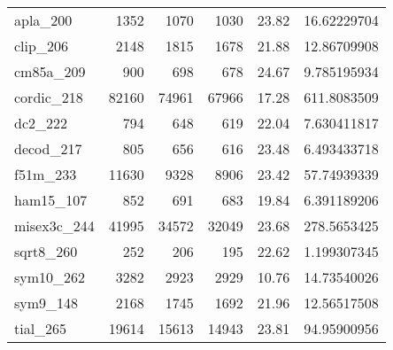 \begin{table}[tbp]
\begin{tabular}{l|r|r|r|r|r}
      apla\_200                      &1352                      &1070                       &1030                       & 23.82                              &16.62229704                            \\
      clip\_206                      &2148                      &1815                       &1678                       & 21.88                              &12.86709908                            \\
      cm85a\_209                     &900                       &698                        &678                        & 24.67                              &9.785195934                            \\
      cordic\_218                    &82160                     &74961                      &67966                      & 17.28                              &611.8083509                            \\
      dc2\_222                       &794                       &648                        &619                        & 22.04                              &7.630411817                            \\
      decod\_217                     &805                       &656                        &616                        & 23.48                              &6.493433718                            \\
      f51m\_233                      &11630                     &9328                       &8906                       & 23.42                              &57.74939339                            \\
      ham15\_107                     &852                       &691                        &683                        & 19.84                              &6.391189206                            \\
      misex3c\_244                   &41995                     &34572                      &32049                      & 23.68                              &278.5653425                            \\
      sqrt8\_260                     &252                       &206                        &195                        & 22.62                              &1.199307345                            \\
      sym10\_262                     &3282                      &2923                       &2929                       & 10.76                              &14.73540026                            \\
      sym9\_148                      &2168                      &1745                       &1692                       & 21.96                              &12.56517508                            \\
      tial\_265                      &19614                     &15613                      &14943                      & 23.81                              &94.95900956                            \\ \hline
  \end{tabular}
\end{table}

